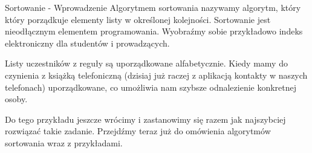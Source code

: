 \documentclass[kslide.tex]{subfiles}
\begin{document}
\begin{frame}{Sortowanie - Wprowadzenie}
        Algorytmem sortowania nazywamy algorytm, który który porządkuje elementy listy w określonej kolejności. Sortowanie jest nieodłącznym elementem programowania. Wyobraźmy sobie przykładowo indeks elektroniczny dla studentów i prowadzących.\\[0.3cm]\pause 
        
        Listy uczestników z reguły są uporządkowane alfabetycznie. Kiedy mamy do czynienia z książką telefoniczną (dzisiaj już raczej z aplikacją kontakty w naszych telefonach) uporządkowane, co umożliwia nam szybsze odnalezienie konkretnej osoby.\\[0.3cm]\pause 
        
        Do tego przykładu jeszcze wrócimy i zastanowimy się razem jak najszybciej rozwiązać takie zadanie. Przejdźmy teraz już do omówienia algorytmów sortowania wraz z przykładami.
\end{frame}
\end{document}

